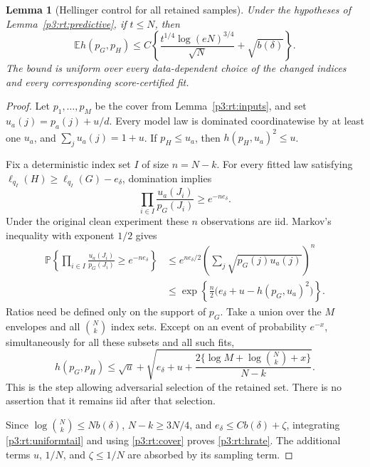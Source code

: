 \documentclass[11pt,a4paper]{article}
\newtheorem{lemma}[theorem]{Lemma}
\theoremstyle{definition}
\theoremstyle{remark}
\numberwithin{equation}{section}
\begin{document}
\begin{lemma}[Hellinger control for all retained samples]\label{p3:rt:hellinger}
Under the hypotheses of Lemma~\ref{p3:rt:predictive}, if $t\le N$, then
\begin{equation}\label{p3:rt:hrate}
 \mathbb E h(p_G,p_H)\le C\left\{
       \frac{t^{1/4}\log(eN)^{3/4}}{\sqrt N}
                                     +\sqrt{b(\delta)}\right\}.
\end{equation}
The bound is uniform over every data-dependent choice of the changed
indices and every corresponding score-certified fit.
\end{lemma}
\begin{proof}
Let $p_1,\ldots,p_M$ be the cover from Lemma~\ref{p3:rt:inputs}, and set
$u_a(j)=p_a(j)+u/d$.  Every model law is dominated coordinatewise by
at least one $u_a$, and $\sum_j u_a(j)=1+u$.  If $p_H\le u_a$, then
$h(p_H,u_a)^2\le u$.

Fix a deterministic index set $I$ of size $n=N-k$.
For every fitted law satisfying
$\ell_{q_I}(H)\ge\ell_{q_I}(G)-e_\delta$, domination implies
\[
 \prod_{i\in I}\frac{u_a(J_i)}{p_G(J_i)}\ge e^{-ne_\delta}.
\]
Under the original clean experiment these $n$ observations are iid.
Markov's inequality with exponent $1/2$ gives
\begin{align*}
 \mathbb P\left\{\prod_{i\in I}\frac{u_a(J_i)}{p_G(J_i)}
                                      \ge e^{-ne_\delta}\right\}
 &\le e^{ne_\delta/2}
           \left(\sum_j\sqrt{p_G(j)u_a(j)}\right)^n\\
 &\le\exp\left\{\frac n2
             \bigl(e_\delta+u-h(p_G,u_a)^2\bigr)\right\}.
\end{align*}
Ratios need be defined only on the support of $p_G$.
Take a union over the $M$ envelopes and all $\binom Nk$ index sets.
Except on an event of probability $e^{-x}$, simultaneously for all
these subsets and all such fits,
\begin{equation}\label{p3:rt:uniformtail}
 h(p_G,p_H)\le\sqrt u+
 \sqrt{e_\delta+u+
          \frac{2\{\log M+\log\binom Nk+x\}}{N-k}}.
\end{equation}
This is the step allowing adversarial selection of the retained set.
There is no assertion that it remains iid after that selection.

Since $\log\binom Nk\le Nb(\delta)$, $N-k\ge3N/4$, and
$e_\delta\le Cb(\delta)+\zeta$, integrating \eqref{p3:rt:uniformtail}
and using \eqref{p3:rt:cover} proves \eqref{p3:rt:hrate}.  The additional
terms $u$, $1/N$, and $\zeta\le1/N$ are absorbed by its sampling term.
\end{proof}
\end{document}
